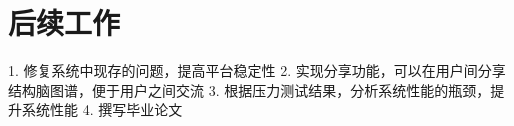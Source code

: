 \section{后续工作}
1. 修复系统中现存的问题，提高平台稳定性
2. 实现分享功能，可以在用户间分享结构脑图谱，便于用户之间交流
3. 根据压力测试结果，分析系统性能的瓶颈，提升系统性能
4. 撰写毕业论文


{
\renewcommand{\chapter}[2]{\section*{#2}\addcontentsline{toc}{section}{#2}}

}